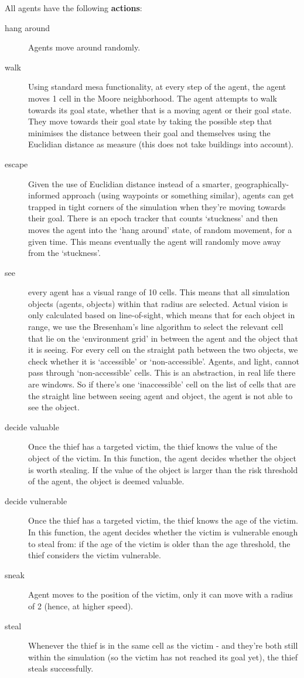 \documentclass[12pt]{article}
\begin{document}
All agents have the following \textbf{actions}:

\begin{description}
\item [hang around] Agents move around randomly.
\item [walk] Using standard mesa functionality, at every step of the agent, the agent moves 1 cell in the Moore neighborhood. The agent attempts to walk towards its goal state, whether that is a moving agent or their goal state. They move towards their goal state by taking the possible step that minimises the distance between their goal and themselves using the Euclidian distance as measure (this does not take buildings into account).
\item [escape]  Given the use of Euclidian distance instead of a smarter, geographically-informed approach (using waypoints or something similar), agents can get trapped in tight corners of the simulation when they're moving towards their goal. There is an epoch tracker that counts `stuckness' and then moves the agent into the `hang around' state, of random movement, for a given time. This means eventually the agent will randomly move away from the `stuckness'.
\item [see] every agent has a visual range of 10 cells. This means that all simulation objects (agents, objects) within that radius are selected. Actual vision is only calculated based on line-of-sight, which means that for each object in range, we use the Bresenham's line algorithm to select the relevant cell that lie on the `environment grid' in between the agent and the object that it is seeing. For every cell on the straight path between the two objects, we check whether it is `accessible' or `non-accessible'. Agents, and light, cannot pass through `non-accessible' cells. This is an abstraction, in real life there are windows. So if there's one `inaccessible' cell on the list of cells that are the straight line between seeing agent and object, the agent is not able to see the object. 
\item [decide valuable] Once the thief has a targeted victim, the thief knows the value of the object of the victim. In this function, the agent decides whether the object is worth stealing. If the value of the object is larger than the risk threshold of the agent, the object is deemed valuable.
\item [decide vulnerable] Once the thief has a targeted victim, the thief knows the age of the victim. In this function, the agent decides whether the victim is vulnerable enough to steal from: if the age of the victim is older than the age threshold, the thief considers the victim vulnerable.
\item [sneak] Agent moves to the position of the victim, only it can move with a radius of 2 (hence, at higher speed).
\item [steal] Whenever the thief is in the same cell as the victim - and they're both still within the simulation (so the victim has not reached its goal yet), the thief steals successfully.
\end{description}
\end{document}
